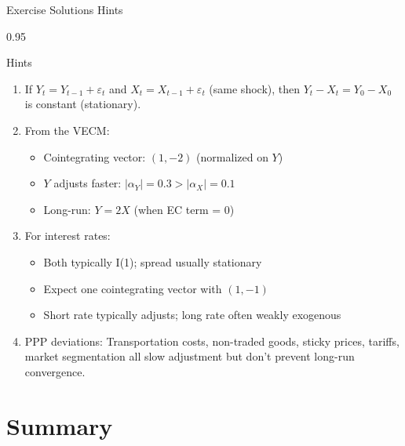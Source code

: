 \documentclass[9pt, aspectratio=169, t]{beamer}
\begin{document}
\begin{frame}{Exercise Solutions Hints}
    \begin{cminipage}{0.95\textwidth}
    {\footnotesize
    \begin{block}{Hints}
        \begin{enumerate}\setlength{\itemsep}{1pt}
            \item If $Y_t = Y_{t-1} + \varepsilon_t$ and $X_t = X_{t-1} + \varepsilon_t$ (same shock), then $Y_t - X_t = Y_0 - X_0$ is constant (stationary).

            \item From the VECM:
                \begin{itemize}\setlength{\itemsep}{0pt}
                    \item Cointegrating vector: $(1, -2)$ (normalized on $Y$)
                    \item $Y$ adjusts faster: $|\alpha_Y| = 0.3 > |\alpha_X| = 0.1$
                    \item Long-run: $Y = 2X$ (when EC term = 0)
                \end{itemize}

            \item For interest rates:
                \begin{itemize}\setlength{\itemsep}{0pt}
                    \item Both typically I(1); spread usually stationary
                    \item Expect one cointegrating vector with $(1, -1)$
                    \item Short rate typically adjusts; long rate often weakly exogenous
                \end{itemize}

            \item PPP deviations: Transportation costs, non-traded goods, sticky prices, tariffs, market segmentation all slow adjustment but don't prevent long-run convergence.
        \end{enumerate}
    \end{block}
    }
    \end{cminipage}
\end{frame}

\section{Summary}
\end{document}
